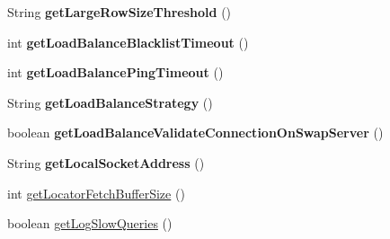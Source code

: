 \begin{DoxyCompactItemize}
\item 
\mbox{\label{classcom_1_1mysql_1_1jdbc_1_1_multi_host_my_s_q_l_connection_a1d249100a7db821176608e2e60f29cee}} 
String {\bfseries get\+Large\+Row\+Size\+Threshold} ()
\item 
\mbox{\label{classcom_1_1mysql_1_1jdbc_1_1_multi_host_my_s_q_l_connection_a69d27adbc18857cb606ffa45697ed24e}} 
int {\bfseries get\+Load\+Balance\+Blacklist\+Timeout} ()
\item 
\mbox{\label{classcom_1_1mysql_1_1jdbc_1_1_multi_host_my_s_q_l_connection_abb72a8f4ade68fc91f97c01f4747a364}} 
int {\bfseries get\+Load\+Balance\+Ping\+Timeout} ()
\item 
\mbox{\label{classcom_1_1mysql_1_1jdbc_1_1_multi_host_my_s_q_l_connection_aa38fab79c7efac8978b1df60dc30bfda}} 
String {\bfseries get\+Load\+Balance\+Strategy} ()
\item 
\mbox{\label{classcom_1_1mysql_1_1jdbc_1_1_multi_host_my_s_q_l_connection_aadb53830ab3d3fb60ab151f718dabf9b}} 
boolean {\bfseries get\+Load\+Balance\+Validate\+Connection\+On\+Swap\+Server} ()
\item 
\mbox{\label{classcom_1_1mysql_1_1jdbc_1_1_multi_host_my_s_q_l_connection_a5e67f5a6827421d75e8eb24793480cda}} 
String {\bfseries get\+Local\+Socket\+Address} ()
\item 
int \mbox{\hyperlink{classcom_1_1mysql_1_1jdbc_1_1_multi_host_my_s_q_l_connection_a681a0098d027412f890b819e9caa4e1d}{get\+Locator\+Fetch\+Buffer\+Size}} ()
\item 
boolean \mbox{\hyperlink{classcom_1_1mysql_1_1jdbc_1_1_multi_host_my_s_q_l_connection_afd156080a8f53fbe1f7ff0063f7fa052}{get\+Log\+Slow\+Queries}} ()
\item 
\mbox{\label{classcom_1_1mysql_1_1jdbc_1_1_multi_host_my_s_q_l_connection_a695fe76f1f2499f081366c075fcbf32e}} 

\end{DoxyCompactItemize}

